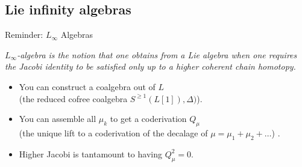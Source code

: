 \documentclass[beamer,10pt,handout]{standalone}  \Handouttrue
\begin{document}
\subsection{Lie infinity algebras}
\begin{frame}{Reminder: $L_\infty$ Algebras}

		\emph{
			$L_\infty$-algebra is the notion that one obtains from a Lie algebra when one requires the Jacobi identity to be satisfied only up to a higher coherent chain homotopy.
		}
		\\
		\vspace{.5em}
		\begin{defblock}
			
		\end{defblock}	
	\pause

	\begin{itemize}
		\item<2-> You can construct a coalgebra out of $L$ \\
			{\small \color{UniGreen} (the reduced cofree coalgebra $S^{\geq 1}(L[1]),\Delta)$)}.
		\item<3-> You can assemble all $\mu_k$ to get a coderivation $Q_\mu$\\
				{\small \color{UniGreen} (the unique lift to a coderivation of the decalage of $ \mu=	\mu_1+\mu_2 + \dots$) }.
		\item<4-> Higher Jacobi is tantamount to having $Q_\mu ^2 = 0$.

	\end{itemize}
\end{frame}
\end{document}

